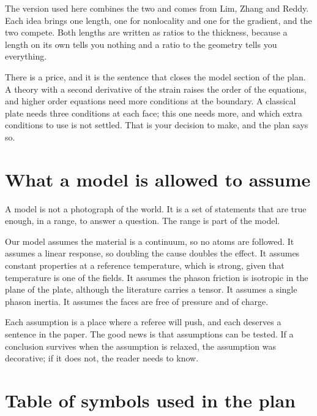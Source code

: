 \documentclass[11pt]{article}
\begin{document}
The version used here combines the two and comes from Lim, Zhang and Reddy. Each idea brings one length, one
for nonlocality and one for the gradient, and the two compete. Both lengths are written as ratios to the
thickness, because a length on its own tells you nothing and a ratio to the geometry tells you everything.

There is a price, and it is the sentence that closes the model section of the plan. A theory with a second
derivative of the strain raises the order of the equations, and higher order equations need more conditions at
the boundary. A classical plate needs three conditions at each face; this one needs more, and which extra
conditions to use is not settled. That is your decision to make, and the plan says so.

\section{What a model is allowed to assume}

A model is not a photograph of the world. It is a set of statements that are true enough, in a range, to
answer a question. The range is part of the model.

Our model assumes the material is a continuum, so no atoms are followed. It assumes a linear response, so
doubling the cause doubles the effect. It assumes constant properties at a reference temperature, which is
strong, given that temperature is one of the fields. It assumes the phason friction is isotropic in the plane
of the plate, although the literature carries a tensor. It assumes a single phason inertia. It assumes the
faces are free of pressure and of charge.

Each assumption is a place where a referee will push, and each deserves a sentence in the paper. The good news
is that assumptions can be tested. If a conclusion survives when the assumption is relaxed, the assumption was
decorative; if it does not, the reader needs to know.

\section{Table of symbols used in the plan}
\end{document}

